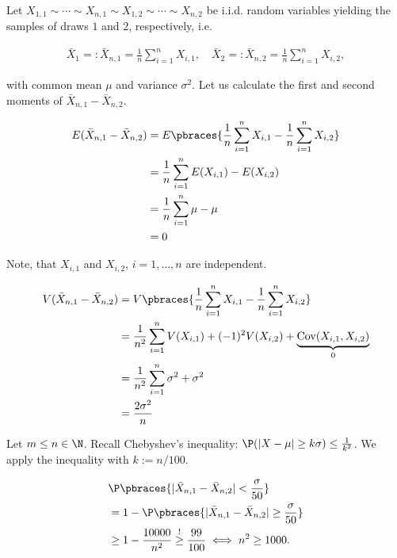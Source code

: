 \begin{solution}

Let $X_{1, 1} \sim \cdots \sim X_{n, 1} \sim X_{1, 2} \sim \cdots \sim X_{n, 2}$ be i.i.d. random variables yielding the samples of draws $1$ and $2$, respectively, i.e.

\begin{align*}
    \bar X_1 =: \bar X_{n, 1} = \frac{1}{n} \sum_{i=1}^n X_{i, 1},
    \quad
    \bar X_2 =: \bar X_{n, 2} = \frac{1}{n} \sum_{i=1}^n X_{i, 2},
\end{align*}

with common mean $\mu$ and variance $\sigma^2$.
Let us calculate the first and second moments of $\bar X_{n, 1} - \bar X_{n, 2}$.

\begin{align*}
    E(\bar X_{n, 1} - \bar X_{n, 2})
    & =
    E
    \pbraces
    {
        \frac{1}{n}
        \sum_{i=1}^n
            X_{i, 1}
            -
        \frac{1}{n}
        \sum_{i=1}^n
            X_{i, 2}
    } \\
    & =
    \frac{1}{n}
    \sum_{i=1}^n
        E(X_{i, 1}) - E(X_{i, 2}) \\
    & =
    \frac{1}{n}
    \sum_{i=1}^n
        \mu - \mu \\
    & =
    0
\end{align*}

Note, that $X_{i, 1}$ and $X_{i, 2}$, $i = 1, \dots, n$ are independent.

\begin{align*}
    V(\bar X_{n, 1} - \bar X_{n, 2})
    & =
    V
    \pbraces
    {
        \frac{1}{n}
        \sum_{i=1}^n
            X_{i, 1}
            -
        \frac{1}{n}
        \sum_{i=1}^n
            X_{i, 2}
    } \\
    & =
    \frac{1}{n^2}
    \sum_{i=1}^n
        V(X_{i, 1}) + (-1)^2 V(X_{i, 2}) + \underbrace{\operatorname{Cov}(X_{i, 1}, X_{i, 2})}_0 \\
    & =
    \frac{1}{n^2}
    \sum_{i=1}^n
        \sigma^2 + \sigma^2 \\
    & =
    \frac{2 \sigma^2}{n}
\end{align*}

Let $m \leq n \in \N$.
Recall Chebyshev's inequality: $\P(|X - \mu| \geq k \sigma)  \leq \frac{1}{k^2}$.
We apply the inequality with $k := n/100$.

\begin{align*}
    &\P \pbraces{|\bar X_{n, 1} - \bar X_{n, 2}| < \frac{\sigma}{50}} \\
    & = 1 - \P\pbraces{|\bar X_{n, 1} - \bar X_{n, 2}| \geq \frac{\sigma}{50}} \\
    &\geq 1 - \frac{10000}{n^2} \stackrel{!}{\geq} \frac{99}{100}
    \iff n^2 \geq 1000.
\end{align*}

\end{solution}

